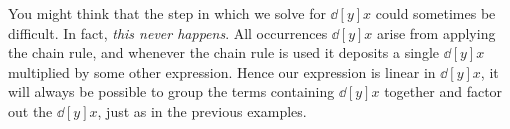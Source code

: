 \documentclass{ximera}
\begin{document}
\begin{example}
\begin{explanation}
\begin{image}
\end{image}
\end{explanation}

\end{example}


You might think that the step in which we solve for $\dd[y]{x}$ could
sometimes be difficult. In fact, \textit{this never happens}. All
occurrences $\dd[y]{x}$ arise from applying the chain rule, and
whenever the chain rule is used it deposits a single $\dd[y]{x}$
multiplied by some other expression. Hence our expression is linear in
$\dd[y]{x}$, it will always be possible to group the terms containing
$\dd[y]{x}$ together and factor out the $\dd[y]{x}$, just as in the
previous examples.

%
\end{document}
